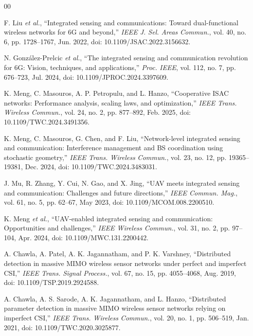 \begin{thebibliography}{00}
	
	F. Liu \emph{et al.}, ``Integrated sensing and communications: Toward dual-functional wireless networks for 6G and beyond,'' \emph{IEEE J. Sel. Areas Commun.}, vol. 40, no. 6, pp. 1728--1767, Jun. 2022, doi: 10.1109/JSAC.2022.3156632.
	
	N. Gonz\'alez-Prelcic \emph{et al.}, ``The integrated sensing and communication revolution for 6G: Vision, techniques, and applications,'' \emph{Proc. IEEE}, vol. 112, no. 7, pp. 676--723, Jul. 2024, doi: 10.1109/JPROC.2024.3397609.
	
	K. Meng, C. Masouros, A. P. Petropulu, and L. Hanzo, ``Cooperative ISAC networks: Performance analysis, scaling laws, and optimization,'' \emph{IEEE Trans. Wireless Commun.}, vol. 24, no. 2, pp. 877--892, Feb. 2025, doi: 10.1109/TWC.2024.3491356.
	
	K. Meng, C. Masouros, G. Chen, and F. Liu, ``Network-level integrated sensing and communication: Interference management and BS coordination using stochastic geometry,'' \emph{IEEE Trans. Wireless Commun.}, vol. 23, no. 12, pp. 19365--19381, Dec. 2024, doi: 10.1109/TWC.2024.3483031.
	
	J. Mu, R. Zhang, Y. Cui, N. Gao, and X. Jing, ``UAV meets integrated sensing and communication: Challenges and future directions,'' \emph{IEEE Commun. Mag.}, vol. 61, no. 5, pp. 62--67, May 2023, doi: 10.1109/MCOM.008.2200510.
	
	K. Meng \emph{et al.}, ``UAV-enabled integrated sensing and communication: Opportunities and challenges,'' \emph{IEEE Wireless Commun.}, vol. 31, no. 2, pp. 97--104, Apr. 2024, doi: 10.1109/MWC.131.2200442.
	
	A. Chawla, A. Patel, A. K. Jagannatham, and P. K. Varshney, ``Distributed detection in massive MIMO wireless sensor networks under perfect and imperfect CSI,'' \emph{IEEE Trans. Signal Process.}, vol. 67, no. 15, pp. 4055--4068, Aug. 2019, doi: 10.1109/TSP.2019.2924588.
	
	A. Chawla, A. S. Sarode, A. K. Jagannatham, and L. Hanzo, ``Distributed parameter detection in massive MIMO wireless sensor networks relying on imperfect CSI,'' \emph{IEEE Trans. Wireless Commun.}, vol. 20, no. 1, pp. 506--519, Jan. 2021, doi: 10.1109/TWC.2020.3025877.
	

\end{thebibliography}
